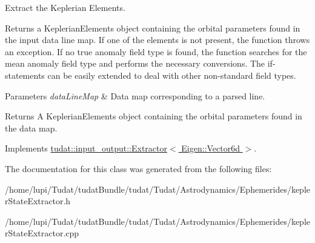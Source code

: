 Extract the Keplerian Elements. 

Returns a Keplerian\+Elements object containing the orbital parameters found in the input data line map. If one of the elements is not present, the function throws an exception. If no true anomaly field type is found, the function searches for the mean anomaly field type and performs the necessary conversions. The if-\/statements can be easily extended to deal with other non-\/standard field types.


\begin{DoxyParams}{Parameters}
{\em data\+Line\+Map} & Data map corresponding to a parsed line. \\
\hline
\end{DoxyParams}
\begin{DoxyReturn}{Returns}
A Keplerian\+Elements object containing the orbital parameters found in the data map. 
\end{DoxyReturn}


Implements \hyperlink{classtudat_1_1input__output_1_1Extractor_a702e1c0f4ffc78cad05c1005e3755e94}{tudat\+::input\+\_\+output\+::\+Extractor$<$ Eigen\+::\+Vector6d $>$}.



The documentation for this class was generated from the following files\+:\begin{DoxyCompactItemize}
\item 
/home/lupi/\+Tudat/tudat\+Bundle/tudat/\+Tudat/\+Astrodynamics/\+Ephemerides/kepler\+State\+Extractor.\+h\item 
/home/lupi/\+Tudat/tudat\+Bundle/tudat/\+Tudat/\+Astrodynamics/\+Ephemerides/kepler\+State\+Extractor.\+cpp\end{DoxyCompactItemize}
